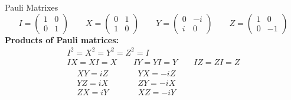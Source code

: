 \begin{frame}{Pauli Matrixes}
    \[
        I=\begin{pmatrix}
              1 & 0 \\ 0 & 1
        \end{pmatrix}
        \qquad
        X=\begin{pmatrix}
              0 & 1 \\ 1 & 0
        \end{pmatrix}
        \qquad
        Y=\begin{pmatrix}
              0 & -i \\ i & 0
        \end{pmatrix}
        \qquad
        Z=\begin{pmatrix}
              1 & 0 \\ 0 & -1
        \end{pmatrix}
    \]
    \newline
    \textbf{Products of Pauli matrices:}
    \begin{gather*}
        I^2=X^2=Y^2=Z^2=I \\
        IX=XI=X
        \qquad
        IY=YI=Y
        \qquad
        IZ=ZI=Z \\
        \begin{aligned}
            &XY=iZ
            \qquad
            &&YX=-iZ \\
            &YZ=iX
            \qquad
            &&ZY=-iX \\
            &ZX=iY
            \qquad
            &&XZ=-iY
        \end{aligned}
    \end{gather*}
    \vspace*{4mm}

\end{frame}